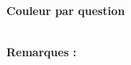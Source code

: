 {\begin{spacing}{1.2}
\begin{center}
		\end{center}
		\vspace{0.3cm}
		\tcblower

		\vspace{0.3cm}
		\renewcommand{\arraystretch}{1.5}
		\begin{center}
			\textbf{Couleur par question} \\[0.3cm]
			\begin{tabular}{| *{12}{C{1.5cm}|} }
				\hline
				\tableheader \\ %
				\hline
			\end{tabular}
		\end{center}
		\vspace{0.3cm}


		\textbf{Remarques : } \\

		\endtcolorbox
	\end{spacing}
}


